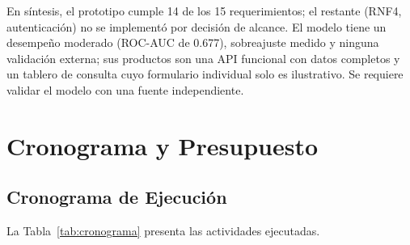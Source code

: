 En síntesis, el prototipo cumple 14 de los 15 requerimientos; el restante (RNF4, autenticación) no se implementó por decisión de alcance. El modelo tiene un desempeño moderado (ROC-AUC de 0.677), sobreajuste medido y ninguna validación externa; sus productos son una API funcional con datos completos y un tablero de consulta cuyo formulario individual solo es ilustrativo. Se requiere validar el modelo con una fuente independiente.

\section{Cronograma y Presupuesto}
\subsection{Cronograma de Ejecución}
La Tabla~\ref{tab:cronograma} presenta las actividades ejecutadas.

